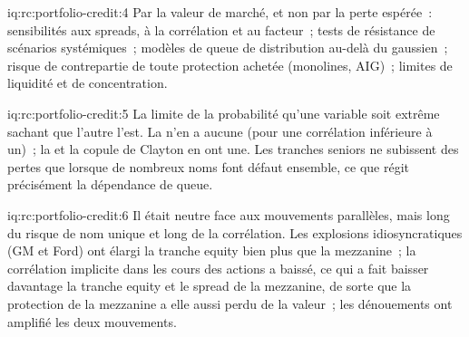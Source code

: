 \begin{solution}{iq:rc:portfolio-credit:4}
Par la valeur de marché, et non par la perte espérée~: sensibilités aux spreads, à la corrélation et au facteur~;
tests de résistance de scénarios systémiques~; modèles de queue de distribution au-delà du gaussien~; risque de
contrepartie de toute protection achetée (monolines, AIG)~; limites de liquidité et de concentration.
\end{solution}

\begin{solution}{iq:rc:portfolio-credit:5}
La limite de la probabilité qu'une variable soit extrême sachant que l'autre l'est. La
 n'en a aucune (pour une corrélation inférieure à un)~; la  et la copule de Clayton
en ont une. Les tranches seniors ne subissent des pertes que lorsque de nombreux noms font défaut ensemble, ce que
régit précisément la dépendance de queue.
\end{solution}

\begin{solution}{iq:rc:portfolio-credit:6}
Il était neutre face aux mouvements parallèles, mais long du risque de nom unique et long de la corrélation. Les
explosions idiosyncratiques (GM et Ford) ont élargi la tranche equity bien plus que la mezzanine~; la corrélation
implicite dans les cours des actions a baissé, ce qui a fait baisser davantage la tranche equity et le spread de la
mezzanine, de sorte que la protection de la mezzanine a elle aussi perdu de la valeur~; les dénouements ont amplifié les deux mouvements.
\end{solution}
